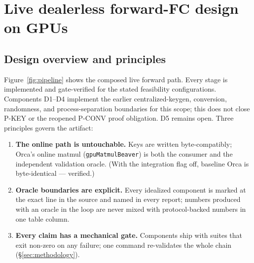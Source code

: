 \documentclass[11pt]{article}
\begin{document}
\section{Live dealerless forward-FC design on GPUs}
\label{sec:design}

\subsection{Design overview and principles}
\label{sec:design-overview}

Figure~\ref{fig:pipeline} shows the composed live forward path. Every stage is
implemented and gate-verified for the stated feasibility configurations.
Components D1--D4 implement the earlier centralized-keygen, conversion,
randomness, and process-separation boundaries for this scope; this does not
close P-KEY or the reopened P-CONV proof obligation. D5 remains open. Three
principles govern the artifact:

\begin{enumerate}
\item \textbf{The online path is untouchable.} Keys are written
  byte-compatibly; Orca's online matmul (\texttt{gpuMatmulBeaver}) is both
  the consumer and the independent validation oracle. (With the integration flag off, baseline
  Orca is byte-identical --- verified.)
\item \textbf{Oracle boundaries are explicit.} Every idealized component is
  marked at the exact line in the source and named in every report; numbers
  produced with an oracle in the loop are never mixed with protocol-backed
  numbers in one table column.
\item \textbf{Every claim has a mechanical gate.} Components ship with
  suites that exit non-zero on any failure; one command re-validates the whole
  chain (\S\ref{sec:methodology}).
\end{enumerate}
\end{document}

